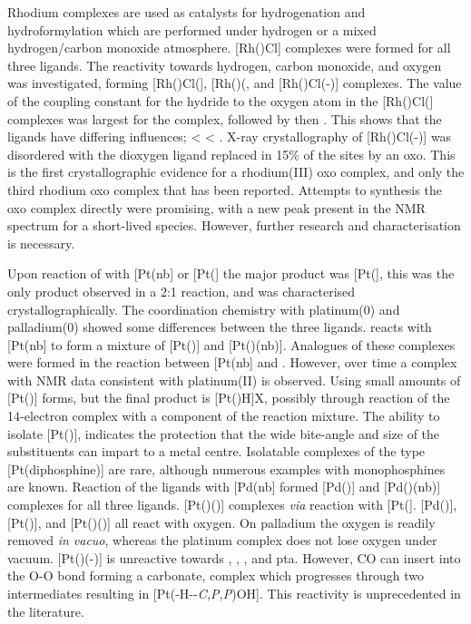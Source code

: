 Rhodium complexes are used as catalysts for hydrogenation and hydroformylation which are performed under hydrogen or a mixed hydrogen/carbon monoxide atmosphere.  [Rh(\tBuxantphosk)Cl] complexes were formed for all three \tBuxantphos{} ligands. The reactivity towards hydrogen, carbon monoxide, and oxygen was investigated, forming [Rh(\tBuxantphosk)Cl(], [Rh(\tBuxantphos)(\ce{CO)2Cl]}, and [Rh(\tBuxantphosk)Cl(-)] complexes.  The value of the \JRhH{} coupling constant for the hydride \trans{} to the oxygen atom in the [Rh(\tBuxantphosk)Cl(] complexes was largest for the \tBusixantphos{} complex, followed by \tButhixantphos{} then \tBuxantphos{}.  This shows that the ligands have differing \trans{} influences; \tBusixantphos{} \textless{} \tButhixantphos{} \textless{} \tBuxantphos.  X-ray crystallography of [Rh(\tBuxantphosk)Cl(-)] was disordered with the dioxygen ligand replaced in 15\% of the sites by an oxo.  This is the first crystallographic evidence for a rhodium(III) oxo complex, and only the third rhodium oxo complex that has been reported.  Attempts to synthesis the oxo complex directly were promising, with a new peak present in the \phosphorus{} NMR spectrum for a short-lived species.  However, further research and characterisation is necessary.

Upon reaction of \Phthixantphos{} with [Pt(nb] or [Pt(] the major product was [Pt(\Phthixantphos{}], this was the only product observed in a 2:1 reaction, and was characterised crystallographically.  The coordination chemistry with platinum(0) and palladium(0) showed some differences between the three \tBuxantphos{} ligands.  \tBuThixantphos{} reacts with [Pt(nb] to form a mixture of [Pt(\tButhixantphos)] and [Pt(\tButhixantphos)(nb)].  Analogues of these complexes were formed in the reaction between [Pt(nb] and \tBusixantphos{}.  However, over time a complex with NMR data consistent with platinum(II) is observed.  Using \tBuxantphos{} small amounts of [Pt(\tBuxantphos)] forms, but the final product is [Pt(\tBuxantphos)H]X, possibly through reaction of the 14-electron complex with a component of the reaction mixture.  The ability to isolate [Pt(\tButhixantphos)], indicates the protection that the wide bite-angle and size of the \tBu{} substituents can impart to a metal centre.  Isolatable complexes of the type [Pt(diphosphine)] are rare, although numerous examples with monophosphines are known.  Reaction of the \tBuxantphos{} ligands with [Pd(nb] formed [Pd(\tBuxantphos)] and [Pd(\tBuxantphos)(nb)] complexes for all three ligands.  [Pt(\tBuxantphos)()] complexes \emph{via} reaction with [Pt(].  [Pd(\tButhixantphos)], [Pt(\tButhixantphos)], and [Pt(\tButhixantphos)()] all react with oxygen.  On palladium the oxygen is readily removed \emph{in vacuo}, whereas the platinum complex does not lose oxygen under vacuum.  [Pt(\tButhixantphos)(-)] is unreactive towards , , ,  and pta.  However, CO can insert into the O-O bond forming a carbonate, complex which progresses through two intermediates resulting in [Pt(\tButhixantphos-H-\dento{}-\emph{C,P,P}\textprime)OH].  This reactivity is unprecedented in the literature.  

